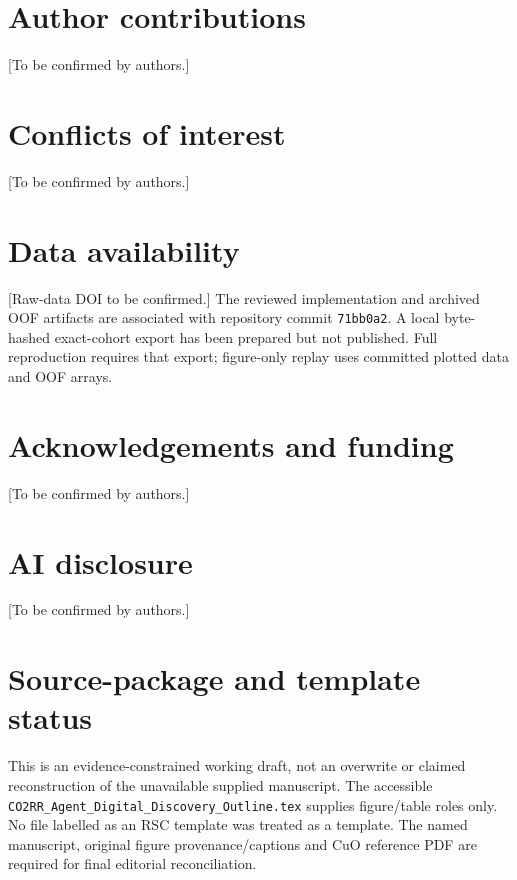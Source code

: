 \documentclass[11pt]{article}
\begin{document}
\clearpage
\section*{Author contributions}
[To be confirmed by authors.]
\section*{Conflicts of interest}
[To be confirmed by authors.]
\section*{Data availability}
[Raw-data DOI to be confirmed.] The reviewed implementation and archived OOF artifacts are associated with repository commit \texttt{71bb0a2}. A local byte-hashed exact-cohort export has been prepared but not published. Full reproduction requires that export; figure-only replay uses committed plotted data and OOF arrays.
\section*{Acknowledgements and funding}
[To be confirmed by authors.]
\section*{AI disclosure}
[To be confirmed by authors.]
\section*{Source-package and template status}
This is an evidence-constrained working draft, not an overwrite or claimed reconstruction of the unavailable supplied manuscript. The accessible \texttt{CO2RR\_Agent\_Digital\_Discovery\_Outline.tex} supplies figure/table roles only. No file labelled as an RSC template was treated as a template. The named manuscript, original figure provenance/captions and CuO reference PDF are required for final editorial reconciliation.
\end{document}
